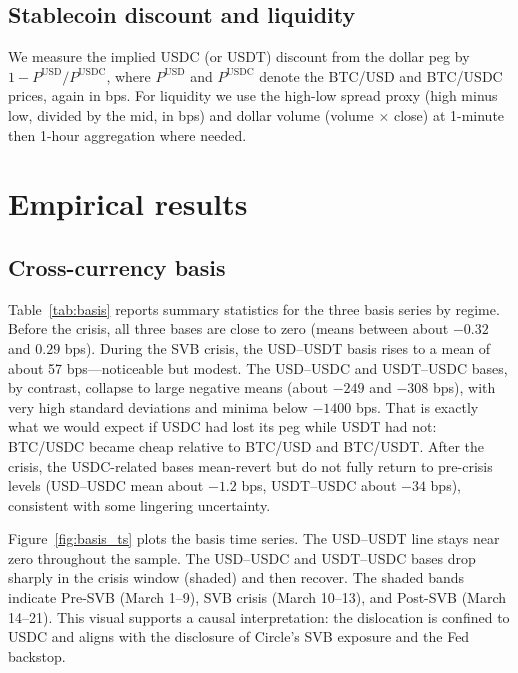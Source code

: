 \documentclass[12pt,oneside,a4paper]{article}
\begin{document}
\subsection{Stablecoin discount and liquidity}

We measure the implied USDC (or USDT) discount from the dollar peg by \(1 - P^{\mathrm{USD}}/P^{\mathrm{USDC}}\), where \(P^{\mathrm{USD}}\) and \(P^{\mathrm{USDC}}\) denote the BTC/USD and BTC/USDC prices, again in bps. For liquidity we use the high-low spread proxy (high minus low, divided by the mid, in bps) and dollar volume (volume $\times$ close) at 1-minute then 1-hour aggregation where needed.

\section{Empirical results}

\subsection{Cross-currency basis}

Table~\ref{tab:basis} reports summary statistics for the three basis series by regime. Before the crisis, all three bases are close to zero (means between about $-0.32$ and $0.29$ bps). During the SVB crisis, the USD--USDT basis rises to a mean of about 57 bps---noticeable but modest. The USD--USDC and USDT--USDC bases, by contrast, collapse to large negative means (about $-249$ and $-308$ bps), with very high standard deviations and minima below $-1400$ bps. That is exactly what we would expect if USDC had lost its peg while USDT had not: BTC/USDC became cheap relative to BTC/USD and BTC/USDT. After the crisis, the USDC-related bases mean-revert but do not fully return to pre-crisis levels (USD--USDC mean about $-1.2$ bps, USDT--USDC about $-34$ bps), consistent with some lingering uncertainty.

\begin{table}[htbp]
\centering
\caption{Cross-currency basis (bps) by regime. Source: \texttt{results/basis\_summary\_by\_regime.csv} (reproduced by \texttt{run\_all.py}).}
\label{tab:basis}

\end{table}

Figure~\ref{fig:basis_ts} plots the basis time series. The USD--USDT line stays near zero throughout the sample. The USD--USDC and USDT--USDC bases drop sharply in the crisis window (shaded) and then recover. The shaded bands indicate Pre-SVB (March 1--9), SVB crisis (March 10--13), and Post-SVB (March 14--21). This visual supports a causal interpretation: the dislocation is confined to USDC and aligns with the disclosure of Circle's SVB exposure and the Fed backstop.
\end{document}
